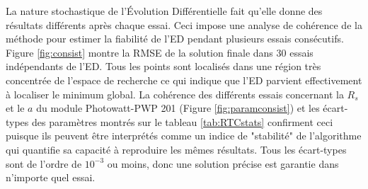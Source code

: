 La nature stochastique de l'Évolution Différentielle fait qu'elle donne des résultats différents après chaque essai. Ceci impose une analyse de cohérence de la méthode pour estimer la fiabilité de l'ED pendant plusieurs essais consécutifs. Figure \ref{fig:consist} montre la RMSE de la solution finale dans 30 essais indépendants de l'ED.
Tous les points sont localisés dans une région très concentrée de l'espace de recherche ce qui indique que l'ED parvient effectivement à localiser le minimum global.
La cohérence des différents essais concernant la $R_s$ et le $a$ du module Photowatt-PWP 201 (Figure \ref{fig:paramconsist}) et les écart-types des paramètres montrés sur le tableau \ref{tab:RTCstats} confirment ceci puisque ils peuvent être interprétés comme un indice de "stabilité" de l'algorithme qui quantifie sa capacité à reproduire les mêmes résultats. Tous les écart-types sont de l'ordre de $10^{-3}$ ou moins, donc une solution précise est garantie dans n'importe quel essai.

